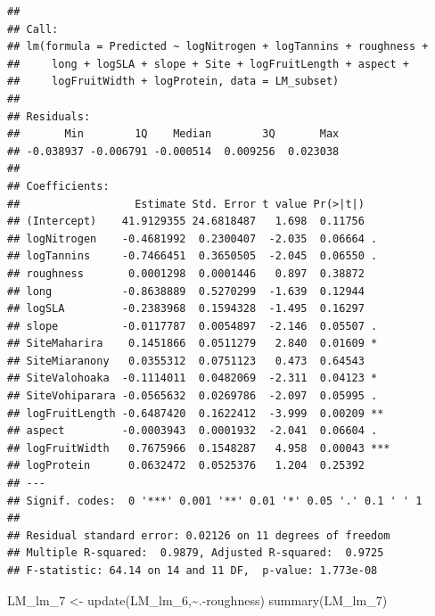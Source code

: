 \documentclass[
  12pt,
]{article}
\newenvironment{Shaded}{\begin{snugshade}}{\end{snugshade}}
\newcommand{\FunctionTok}[1]{\textcolor[rgb]{0.00,0.00,0.00}{#1}}
\newcommand{\NormalTok}[1]{#1}
\newcommand{\OtherTok}[1]{\textcolor[rgb]{0.56,0.35,0.01}{#1}}
\newcommand{\SpecialCharTok}[1]{\textcolor[rgb]{0.00,0.00,0.00}{#1}}
\begin{document}
\begin{verbatim}
## 
## Call:
## lm(formula = Predicted ~ logNitrogen + logTannins + roughness + 
##     long + logSLA + slope + Site + logFruitLength + aspect + 
##     logFruitWidth + logProtein, data = LM_subset)
## 
## Residuals:
##       Min        1Q    Median        3Q       Max 
## -0.038937 -0.006791 -0.000514  0.009256  0.023038 
## 
## Coefficients:
##                  Estimate Std. Error t value Pr(>|t|)    
## (Intercept)    41.9129355 24.6818487   1.698  0.11756    
## logNitrogen    -0.4681992  0.2300407  -2.035  0.06664 .  
## logTannins     -0.7466451  0.3650505  -2.045  0.06550 .  
## roughness       0.0001298  0.0001446   0.897  0.38872    
## long           -0.8638889  0.5270299  -1.639  0.12944    
## logSLA         -0.2383968  0.1594328  -1.495  0.16297    
## slope          -0.0117787  0.0054897  -2.146  0.05507 .  
## SiteMaharira    0.1451866  0.0511279   2.840  0.01609 *  
## SiteMiaranony   0.0355312  0.0751123   0.473  0.64543    
## SiteValohoaka  -0.1114011  0.0482069  -2.311  0.04123 *  
## SiteVohiparara -0.0565632  0.0269786  -2.097  0.05995 .  
## logFruitLength -0.6487420  0.1622412  -3.999  0.00209 ** 
## aspect         -0.0003943  0.0001932  -2.041  0.06604 .  
## logFruitWidth   0.7675966  0.1548287   4.958  0.00043 ***
## logProtein      0.0632472  0.0525376   1.204  0.25392    
## ---
## Signif. codes:  0 '***' 0.001 '**' 0.01 '*' 0.05 '.' 0.1 ' ' 1
## 
## Residual standard error: 0.02126 on 11 degrees of freedom
## Multiple R-squared:  0.9879, Adjusted R-squared:  0.9725 
## F-statistic: 64.14 on 14 and 11 DF,  p-value: 1.773e-08
\end{verbatim}

\begin{Shaded}
\begin{Highlighting}[]
\NormalTok{LM\_lm\_7 }\OtherTok{\textless{}{-}} \FunctionTok{update}\NormalTok{(LM\_lm\_6,}\SpecialCharTok{\textasciitilde{}}\NormalTok{.}\SpecialCharTok{{-}}\NormalTok{roughness)}
\FunctionTok{summary}\NormalTok{(LM\_lm\_7)}
\end{Highlighting}
\end{Shaded}
\end{document}
